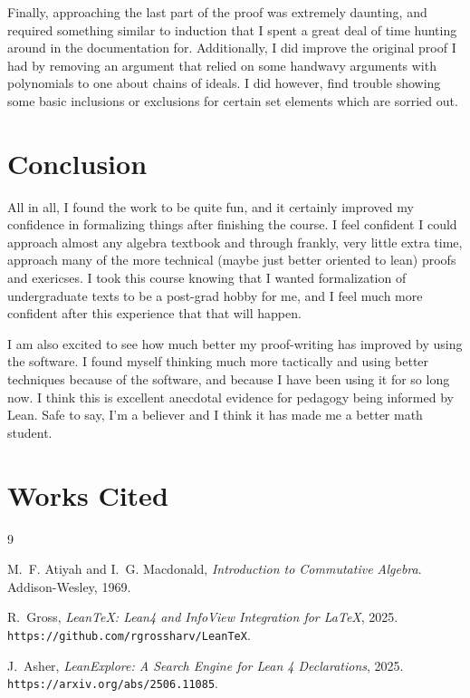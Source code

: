 \documentclass{article}
\begin{document}
\medskip

Finally, approaching the last part of the proof was extremely daunting, and required something similar to induction that I spent a great deal of time hunting around in the documentation for. Additionally, I did improve the original proof I had by removing an argument that relied on some handwavy arguments with polynomials to one about chains of ideals. I did however, find trouble showing some basic inclusions or exclusions for certain set elements which are sorried out. 

\section{Conclusion}

All in all, I found the work to be quite fun, and it certainly improved my confidence in formalizing things after finishing the course. I feel confident I could approach almost any algebra textbook and through frankly, very little extra time, approach many of the more technical (maybe just better oriented to lean) proofs and exericses. I took this course knowing that I wanted formalization of undergraduate texts to be a post-grad hobby for me, and I feel much more confident after this experience that that will happen. 

\medskip
\noindent
I am also excited to see how much better my proof-writing has improved by using the software. I found myself thinking much more tactically and using better techniques because of the software, and because I have been using it for so long now. I think this is excellent anecdotal evidence for pedagogy being informed by Lean. Safe to say, I'm a believer and I think it has made me a better math student.  

\section{Works Cited}

\begin{thebibliography}{9}

M.~F. Atiyah and I.~G. Macdonald,
\textit{Introduction to Commutative Algebra}.
Addison-Wesley, 1969.

R.~Gross,
\textit{LeanTeX: Lean4 and InfoView Integration for LaTeX}, 2025.
{\tt https://github.com/rgrossharv/LeanTeX}.

J.~Asher,
\textit{LeanExplore: A Search Engine for Lean 4 Declarations}, 2025.
{\tt https://arxiv.org/abs/2506.11085}.

\end{thebibliography}
\end{document}
